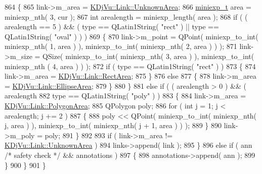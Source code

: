 \begin{DoxyCode}
864         \{
865             link->m\_area = \hyperlink{classKDjVu_1_1Link_ae7930012fef50123e69d2c97897afd9aa6c0cf99a52f0b175a8feaaaa76edceeb}{KDjVu::Link::UnknownArea};
866             \hyperlink{kdjvu_8h_a58955b1a7edfc6e6ccb48402f744802b}{miniexp\_t} area = miniexp\_nth( 3, cur );
867             \textcolor{keywordtype}{int} arealength = miniexp\_length( area );
868             \textcolor{keywordflow}{if} ( ( arealength == 5 ) && ( type == QLatin1String( \textcolor{stringliteral}{"rect"} ) || type == QLatin1String( \textcolor{stringliteral}{"oval"} 
      ) ) )
869             \{
870                 link->m\_point = QPoint( miniexp\_to\_int( miniexp\_nth( 1, area ) ), miniexp\_to\_int( 
      miniexp\_nth( 2, area ) ) );
871                 link->m\_size = QSize( miniexp\_to\_int( miniexp\_nth( 3, area ) ), miniexp\_to\_int( miniexp\_nth
      ( 4, area ) ) );
872                 \textcolor{keywordflow}{if} ( type == QLatin1String( \textcolor{stringliteral}{"rect"} ) )
873                 \{
874                     link->m\_area = \hyperlink{classKDjVu_1_1Link_ae7930012fef50123e69d2c97897afd9aa6897a602cd1401eb6d0ccc4bd5127ed1}{KDjVu::Link::RectArea};
875                 \}
876                 \textcolor{keywordflow}{else}
877                 \{
878                     link->m\_area = \hyperlink{classKDjVu_1_1Link_ae7930012fef50123e69d2c97897afd9aa47d6a7b999bac1147973a3b3d272516c}{KDjVu::Link::EllipseArea};
879                 \}
880             \}
881             \textcolor{keywordflow}{else} \textcolor{keywordflow}{if} ( ( arealength > 0 ) && ( arealength %
882                       type == QLatin1String( \textcolor{stringliteral}{"poly"} ) )
883             \{
884                 link->m\_area = \hyperlink{classKDjVu_1_1Link_ae7930012fef50123e69d2c97897afd9aa354fba105f6cef2461151c1b9e23024e}{KDjVu::Link::PolygonArea};
885                 QPolygon poly;
886                 \textcolor{keywordflow}{for} ( \textcolor{keywordtype}{int} j = 1; j < arealength; j += 2 ) 
887                 \{
888                     poly << QPoint( miniexp\_to\_int( miniexp\_nth( j, area ) ), miniexp\_to\_int( miniexp\_nth( 
      j + 1, area ) ) );
889                 \}
890                 link->m\_poly = poly;
891             \}
892 
893             \textcolor{keywordflow}{if} ( link->m\_area != \hyperlink{classKDjVu_1_1Link_ae7930012fef50123e69d2c97897afd9aa6c0cf99a52f0b175a8feaaaa76edceeb}{KDjVu::Link::UnknownArea} )
894                 links->append( link );
895         \}
896         \textcolor{keywordflow}{else} \textcolor{keywordflow}{if} ( ann \textcolor{comment}{/* safety check */} && annotations )
897         \{
898             annotations->append( ann );
899         \}
900     \}
901 \}
\end{DoxyCode}
